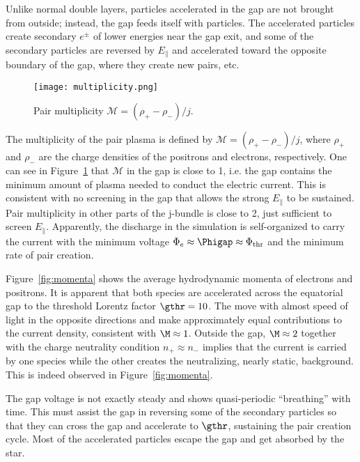 Unlike normal double layers, particles accelerated in the gap are not brought
from outside; instead, the gap feeds itself with particles. The accelerated
particles create secondary $e^\pm$ of lower energies near the gap exit, and some
of the secondary particles are reversed by $E_\parallel$ and accelerated toward
the opposite boundary of the gap, where they create new pairs, etc.


\begin{figure}[t]
  \centering
  \texttt{[image: multiplicity.png]}
  \caption{Pair multiplicity $\mathcal{M} = (\rho_+ - \rho_{-})/j$.}
  \label{fig:multiplicity}
\end{figure}

The multiplicity of the pair plasma is defined by $\mathcal{M} = (\rho_+-\rho_{-})/j$,
where $\rho_+$ and $\rho_-$ are the charge densities of the positrons and electrons,
respectively. One can see in Figure~\ref{fig:multiplicity} that $\mathcal{M}$
in the gap is close to 1, i.e. the gap contains the minimum amount of plasma needed to
conduct the electric current.
This is consistent
with no screening in the gap that allows the strong $E_\parallel$ to be
sustained. Pair multiplicity in other parts of the j-bundle is
close to 2,
just sufficient to screen $E_\parallel$. Apparently, the discharge in the
simulation is self-organized to carry the current with the minimum voltage
$\Phi_e\approx\Phigap\approx\Phi_{\rm thr}$ and the minimum rate of pair
creation.

Figure~\ref{fig:momenta} shows the average hydrodynamic momenta of
electrons and positrons. It is apparent that both species are accelerated across the
equatorial gap to the threshold Lorentz factor $\gthr=10$. The move with almost
speed of light in the opposite directions and make approximately equal contributions
to the current density, consistent with $\M\approx 1$.
Outside the gap,
$\M\approx 2$ together with the charge neutrality condition $n_+\approx n_-$
implies that the current is carried by one species while the other creates the
neutralizing, nearly static, background. This is indeed observed in
Figure~\ref{fig:momenta}.

The gap voltage is not exactly steady and shows quasi-periodic ``breathing'' with time.
This must assist the gap in reversing some of the secondary particles so that
they can cross the gap and accelerate to $\gthr$, sustaining the pair creation cycle.
Most of the accelerated particles escape the gap and get absorbed by the star.

